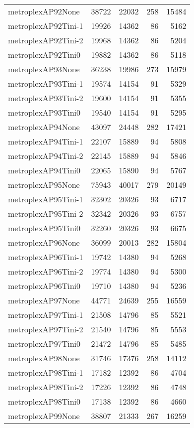\begin{longtable}{lrrrr}
metroplexAP92None & 38722 & 22032 & 258 & 15484 \\
metroplexAP92Tini-1 & 19926 & 14362 & 86 & 5162 \\
metroplexAP92Tini-2 & 19968 & 14362 & 86 & 5204 \\
metroplexAP92Tini0 & 19882 & 14362 & 86 & 5118 \\
metroplexAP93None & 36238 & 19986 & 273 & 15979 \\
metroplexAP93Tini-1 & 19574 & 14154 & 91 & 5329 \\
metroplexAP93Tini-2 & 19600 & 14154 & 91 & 5355 \\
metroplexAP93Tini0 & 19540 & 14154 & 91 & 5295 \\
metroplexAP94None & 43097 & 24448 & 282 & 17421 \\
metroplexAP94Tini-1 & 22107 & 15889 & 94 & 5808 \\
metroplexAP94Tini-2 & 22145 & 15889 & 94 & 5846 \\
metroplexAP94Tini0 & 22065 & 15890 & 94 & 5767 \\
metroplexAP95None & 75943 & 40017 & 279 & 20149 \\
metroplexAP95Tini-1 & 32302 & 20326 & 93 & 6717 \\
metroplexAP95Tini-2 & 32342 & 20326 & 93 & 6757 \\
metroplexAP95Tini0 & 32260 & 20326 & 93 & 6675 \\
metroplexAP96None & 36099 & 20013 & 282 & 15804 \\
metroplexAP96Tini-1 & 19742 & 14380 & 94 & 5268 \\
metroplexAP96Tini-2 & 19774 & 14380 & 94 & 5300 \\
metroplexAP96Tini0 & 19710 & 14380 & 94 & 5236 \\
metroplexAP97None & 44771 & 24639 & 255 & 16559 \\
metroplexAP97Tini-1 & 21508 & 14796 & 85 & 5521 \\
metroplexAP97Tini-2 & 21540 & 14796 & 85 & 5553 \\
metroplexAP97Tini0 & 21472 & 14796 & 85 & 5485 \\
metroplexAP98None & 31746 & 17376 & 258 & 14112 \\
metroplexAP98Tini-1 & 17182 & 12392 & 86 & 4704 \\
metroplexAP98Tini-2 & 17226 & 12392 & 86 & 4748 \\
metroplexAP98Tini0 & 17138 & 12392 & 86 & 4660 \\
metroplexAP99None & 38807 & 21333 & 267 & 16259 \\

\end{longtable}
